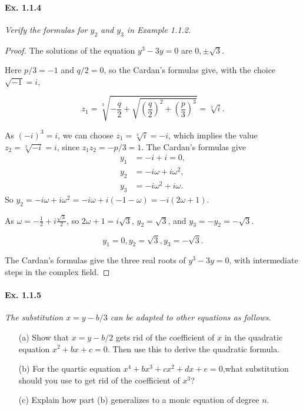 \documentclass[11pt,a4paper]{article}
\begin{document}
\paragraph{Ex. 1.1.4}

{\it Verify the formulas for $y_2$ and $y_3$ in Example 1.1.2.
}

\begin{proof}
The solutions of the equation $y^3 - 3y=0$ are $0,\pm \sqrt{3}$.

Here $p/3=-1$ and $q/2=0$, so the Cardan's formulas give, with the choice $\sqrt{-1} = i$, 

$$z_1 = \sqrt[3]{-\frac{q}{2}+\sqrt{\left(\frac{q}{2}\right)^2 + \left(\frac{p}{3}\right)^3}}= \sqrt[3]{i}.$$

As $(-i)^3 = i$, we can choose  $z_1 = \sqrt[3]{i} = -i$, which implies the value $z_2 = \sqrt[3]{-i} = i$, since $z_1z_2 = -p/3=1$.
The Cardan's formulas give
\begin{align*}
y_1 &= -i+i =0,\\
y_2 &= -i \omega + i \omega^2,\\
y_3 &= -i \omega^2 + i \omega.
\end{align*}
So $y_2 = -i \omega + i \omega^2 = -i\omega+i(-1-\omega) = -i(2\omega+1)$.

As  $\omega = -\frac{1}{2}+ i \frac{\sqrt{3}}{2}$, so $2 \omega +1 = i\sqrt{3}$, $y_2 = \sqrt{3}$, and $y_3 = -y_2 = -\sqrt{3}$.

$$y_1=0 , y_2 = \sqrt{3}, y_3 = -\sqrt{3}.$$

The Cardan's formulas give the three real roots of $y^3-3y=0$, with intermediate steps in the complex field.
\end{proof}

\paragraph{Ex. 1.1.5}

{\it The substitution $x= y - b/3$ can be adapted to other equations as follows.
\begin{enumerate}
\item[(a)]
Show that $x=y - b/2$ gets rid of the coefficient of $x$ in the quadratic equation $x^2+bx+c=0$. Then use this to derive the quadratic formula.

\item[(b)]For the quartic equation $x^4+bx^3+cx^2+dx+e=0$,what substitution should you use to
get rid of the coefficient of $x^3$? 

\item[(c)] Explain how part (b) generalizes to a monic equation of degree $n$.
\end{enumerate}
}
\end{document}
